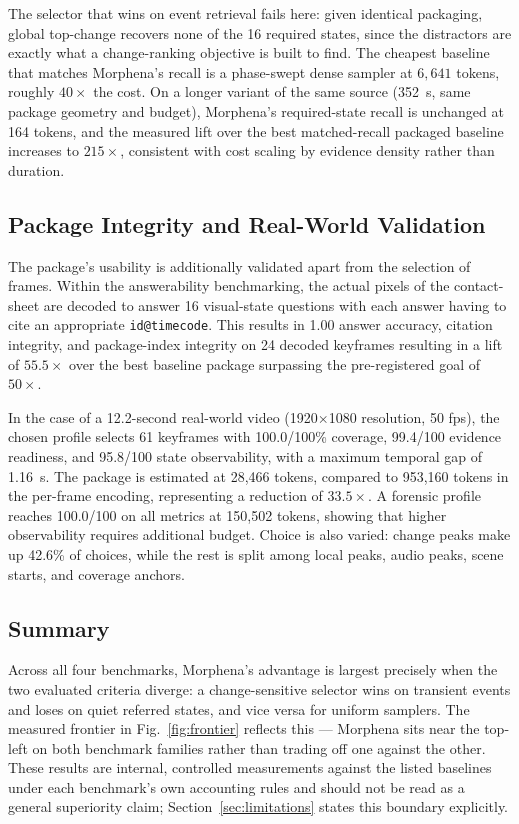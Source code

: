 \documentclass[conference]{IEEEtran}
\begin{document}
The selector that wins on event retrieval fails here: given identical packaging, global top-change recovers none of the 16 required states, since the distractors are exactly what a change-ranking objective is built to find. The cheapest baseline that matches Morphena's recall is a phase-swept dense sampler at $6{,}641$ tokens, roughly $40\times$ the cost. On a longer variant of the same source (352~s, same package geometry and budget), Morphena's required-state recall is unchanged at 164 tokens, and the measured lift over the best matched-recall packaged baseline increases to $215\times$, consistent with cost scaling by evidence density rather than duration.

\subsection{Package Integrity and Real-World Validation}
The package’s usability is additionally validated apart from the selection of frames. Within the answerability benchmarking, the actual pixels of the contact-sheet are decoded to answer 16 visual-state questions with each answer having to cite an appropriate \texttt{id@timecode}. This results in 1.00 answer accuracy, citation integrity, and package-index integrity on 24 decoded keyframes resulting in a lift of $55.5\times$ over the best baseline package surpassing the pre-registered goal of $50\times$.

In the case of a 12.2-second real-world video (1920$\times$1080 resolution, 50 fps), the chosen profile selects 61 keyframes with 100.0/100\% coverage, 99.4/100 evidence readiness, and 95.8/100 state observability, with a maximum temporal gap of 1.16~s. The package is estimated at 28{,}466 tokens, compared to 953{,}160 tokens in the per-frame encoding, representing a reduction of $33.5\times$. A forensic profile reaches 100.0/100 on all metrics at 150{,}502 tokens, showing that higher observability requires additional budget. Choice is also varied: change peaks make up 42.6\% of choices, while the rest is split among local peaks, audio peaks, scene starts, and coverage anchors.

\subsection{Summary}
Across all four benchmarks, Morphena's advantage is largest precisely when the two evaluated criteria diverge: a change-sensitive selector wins on transient events and loses on quiet referred states, and vice versa for uniform samplers. The measured frontier in Fig.~\ref{fig:frontier} reflects this — Morphena sits near the top-left on both benchmark families rather than trading off one against the other. These results are internal, controlled measurements against the listed baselines under each benchmark's own accounting rules and should not be read as a general superiority claim; Section~\ref{sec:limitations} states this boundary explicitly.
\end{document}
